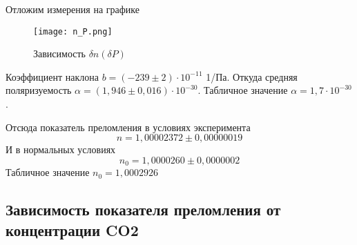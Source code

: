 Отложим измерения на графике

\begin{figure}[H]
	\centering
	\texttt{[image: n\_P.png]}
	\caption{Зависимость $\delta n (\delta P)$}
\end{figure}

Коэффициент наклона $b = (-239 \pm 2) \cdot 10^{-11}$ 1/Па. Откуда средняя поляризуемость $\alpha = (1,946 \pm 0,016) \cdot 10^{-30}$. Табличное значение $\alpha = 1,7 \cdot 10^{-30}$.

Отсюда показатель преломления в условиях эксперимента
$$n = 1,00002372 \pm 0,00000019$$
И в нормальных условиях
\[
	n_0 = 1,0000260 \pm 0,0000002
\]
Табличное значение $n_0 = 1,0002926$

\subsection{Зависимость показателя преломления от концентрации CO2}

